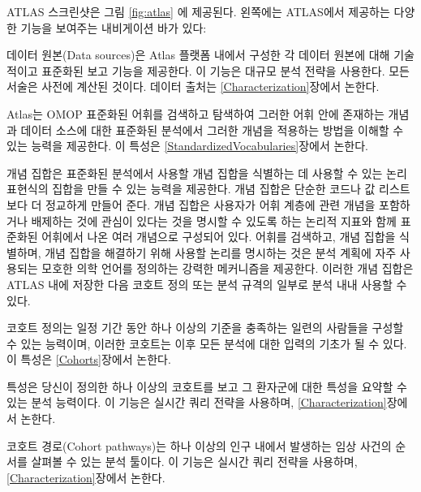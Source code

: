 \documentclass[11pt]{book}
\providecommand{\tightlist}{%
  \setlength{\itemsep}{0pt}\setlength{\parskip}{0pt}}
\theoremstyle{definition}
\theoremstyle{definition}
\theoremstyle{definition}
\theoremstyle{remark}
\begin{document}
ATLAS 스크린샷은 그림 \ref{fig:atlas} 에 제공된다. 왼쪽에는 ATLAS에서
제공하는 다양한 기능을 보여주는 내비게이션 바가 있다:

\begin{description}
\tightlist
\item[Data Sources \index{ATLAS!Data Sources}
\index{Achilles|see {ATLAS!data sources}}]
데이터 원본(Data sources)은 Atlas 플랫폼 내에서 구성한 각 데이터 원본에
대해 기술적이고 표준화된 보고 기능을 제공한다. 이 기능은 대규모 분석
전략을 사용한다. 모든 서술은 사전에 계산된 것이다. 데이터 출처는
\ref{Characterization}장에서 논한다.
\item[Vocabulary Search \index{ATLAS!vocabulary search}]
Atlas는 OMOP 표준화된 어휘를 검색하고 탐색하여 그러한 어휘 안에 존재하는
개념과 데이터 소스에 대한 표준화된 분석에서 그러한 개념을 적용하는
방법을 이해할 수 있는 능력을 제공한다. 이 특성은
\ref{StandardizedVocabularies}장에서 논한다.
\item[Concept Sets \index{ATLAS!concept sets}]
개념 집합은 표준화된 분석에서 사용할 개념 집합을 식별하는 데 사용할 수
있는 논리 표현식의 집합을 만들 수 있는 능력을 제공한다. 개념 집합은
단순한 코드나 값 리스트보다 더 정교하게 만들어 준다. 개념 집합은
사용자가 어휘 계층에 관련 개념을 포함하거나 배제하는 것에 관심이 있다는
것을 명시할 수 있도록 하는 논리적 지표와 함께 표준화된 어휘에서 나온
여러 개념으로 구성되어 있다. 어휘를 검색하고, 개념 집합을 식별하며, 개념
집합을 해결하기 위해 사용할 논리를 명시하는 것은 분석 계획에 자주
사용되는 모호한 의학 언어를 정의하는 강력한 메커니즘을 제공한다. 이러한
개념 집합은 ATLAS 내에 저장한 다음 코호트 정의 또는 분석 규격의 일부로
분석 내내 사용할 수 있다.
\item[Cohort Definitions \index{ATLAS!cohort definitions}]
코호트 정의는 일정 기간 동안 하나 이상의 기준을 충족하는 일련의 사람들을
구성할 수 있는 능력이며, 이러한 코호트는 이후 모든 분석에 대한 입력의
기초가 될 수 있다. 이 특성은 \ref{Cohorts}장에서 논한다.
\item[Characterizations \index{ATLAS!cohort characterization}]
특성은 당신이 정의한 하나 이상의 코호트를 보고 그 환자군에 대한 특성을
요약할 수 있는 분석 능력이다. 이 기능은 실시간 쿼리 전략을 사용하며,
\ref{Characterization}장에서 논한다.
\item[Cohort Pathways \index{ATLAS!cohort pathways}]
코호트 경로(Cohort pathways)는 하나 이상의 인구 내에서 발생하는 임상
사건의 순서를 살펴볼 수 있는 분석 툴이다. 이 기능은 실시간 쿼리 전략을
사용하며, \ref{Characterization}장에서 논한다.
\item[Incidence Rates \index{ATLAS!incidence rates}]

\end{description}
\end{document}
